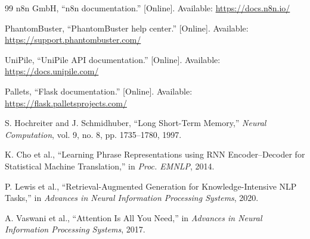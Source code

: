 \documentclass[12pt,a4paper]{report}
\begin{document}
\begin{thebibliography}{99}
n8n GmbH, ``n8n documentation.'' [Online]. Available: \url{https://docs.n8n.io/}

PhantomBuster, ``PhantomBuster help center.'' [Online]. Available: \url{https://support.phantombuster.com/}

UniPile, ``UniPile API documentation.'' [Online]. Available: \url{https://docs.unipile.com/}

Pallets, ``Flask documentation.'' [Online]. Available: \url{https://flask.palletsprojects.com/}

S. Hochreiter and J. Schmidhuber, ``Long Short-Term Memory,'' \textit{Neural Computation}, vol. 9, no. 8, pp. 1735--1780, 1997.

K. Cho et al., ``Learning Phrase Representations using RNN Encoder--Decoder for Statistical Machine Translation,'' in \textit{Proc. EMNLP}, 2014.

P. Lewis et al., ``Retrieval-Augmented Generation for Knowledge-Intensive NLP Tasks,'' in \textit{Advances in Neural Information Processing Systems}, 2020.

A. Vaswani et al., ``Attention Is All You Need,'' in \textit{Advances in Neural Information Processing Systems}, 2017.

\end{thebibliography}
\end{document}
